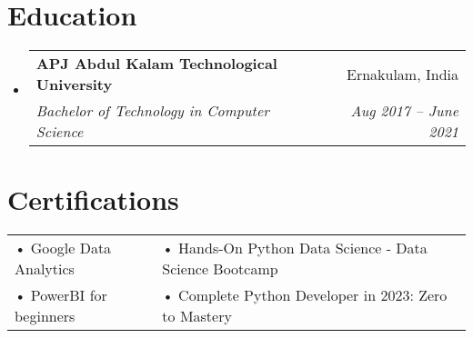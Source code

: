 \documentclass[letterpaper,10pt]{article}
\makeatletter
\newcommand{\resumeSubheading}[4]{
\vspace{-1pt}\item
  \begin{tabular*}{0.97\textwidth}[t]{l@{\extracolsep{\fill}}r}
    \textbf{#1} & #2 \\
    \textit{#3} & \textit{#4} \\
  \end{tabular*}\vspace{-7pt}
}
\newcommand{\resumeSubHeadingList}{\begin{itemize}[leftmargin=0.15in, label={}]}
\newcommand{\resumeSubHeadingListEnd}{\end{itemize}}
\makeatother
\begin{document}
\section{Education}
\resumeSubHeadingList
\resumeSubheading
{APJ Abdul Kalam Technological University}{Ernakulam, India}
{Bachelor of Technology in Computer Science }{Aug 2017 -- June 2021}
\resumeSubHeadingListEnd

\section{Certifications}
\begin{tabular}{p{10cm}p{10cm}}
  • Google Data Analytics     & • Hands-On Python Data Science - Data Science Bootcamp   
  \\
  • PowerBI for beginners     & • Complete Python Developer in 2023: Zero to Mastery
  \\
\end{tabular}
\end{document}
